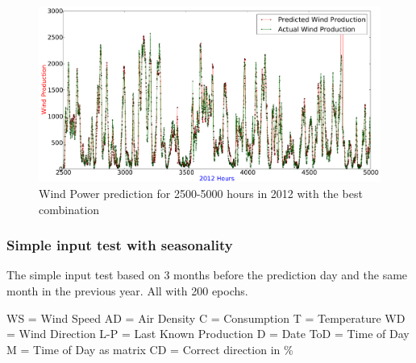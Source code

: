 \begin{figure}
\centering
\includegraphics[width=0.99\linewidth]{billeder/bestInputCombi2500-5000.png}
\caption{Wind Power prediction for 2500-5000 hours in 2012 with the best combination}
\label{fig:bestInputCombi2500-5000}
\end{figure} 

\subsubsection{Simple input test with seasonality}
\label{sec:simpleInputTestSeason}
The simple input test based on 3 months before the prediction day and the same month in the previous year. All with 200 epochs.

WS = Wind Speed
AD = Air Density
C = Consumption
T = Temperature
WD = Wind Direction
L-P = Last Known Production
D = Date
ToD = Time of Day
M = Time of Day as matrix
CD = Correct direction in \%

